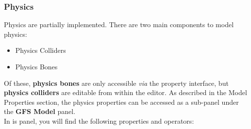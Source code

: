 \documentclass{article}
\begin{document}
\subsubsection{Physics}
\label{SECTION::Edits::Model::Physics}
Physics are partially implemented. There are two main components to model physics:
\begin{itemize}
\item Physics Colliders
\item Physics Bones
\end{itemize}
Of these, \textbf{physics bones} are only accessible \textit{via} the property interface, but \textbf{physics colliders} are editable from within the editor. As described in the Model Properties section, the physics properties can be accessed as a sub-panel under the \textbf{GFS Model} panel.\\
In is panel, you will find the following properties and operators:
\end{document}
